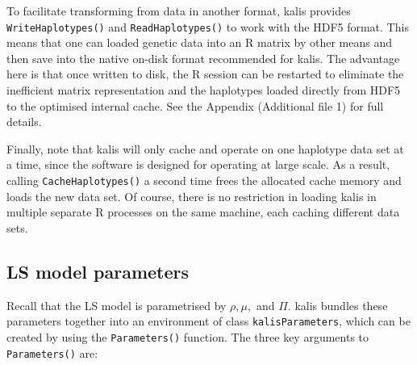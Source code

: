 \documentclass[a4paper]{article}
\let\proglang=\textsf
\newcommand{\pkg}[1]{{\fontseries{m}\fontseries{b}\selectfont #1}}
\begin{document}
To facilitate transforming from data in another format, \pkg{kalis} provides \texttt{WriteHaplotypes()} and \texttt{ReadHaplotypes()} to work with the HDF5 format.
This means that one can loaded genetic data into an \proglang{R} matrix by other means and then save into the native on-disk format recommended for \pkg{kalis}.
The advantage here is that once written to disk, the \proglang{R} session can be restarted to eliminate the inefficient matrix representation and the haplotypes loaded directly from HDF5 to the optimised internal cache.
See the Appendix (Additional file 1) for full details.

Finally, note that \pkg{kalis} will only cache and operate on one haplotype data set at a time, since the software is designed for operating at large scale.
As a result, calling \texttt{CacheHaplotypes()} a second time frees the allocated cache memory and loads the new data set.
Of course, there is no restriction in loading \pkg{kalis} in multiple separate \proglang{R} processes on the same machine, each caching different data sets.



\subsection*{LS model parameters}
\label{ls-model-parameters}

Recall that the LS model is parametrised by \(\rho, \mu,\) and \(\Pi\).
\pkg{kalis} bundles these parameters together into an environment of class \texttt{kalisParameters}, which can be created by using the \texttt{Parameters()} function.
The three key arguments to \texttt{Parameters()} are:
\end{document}
